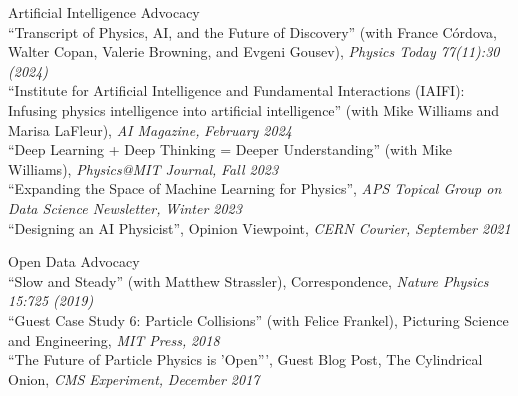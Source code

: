 \item Artificial Intelligence Advocacy\\ ``Transcript of Physics, AI, and the Future of Discovery'' (with France Córdova, Walter Copan, Valerie Browning, and Evgeni Gousev), \emph{Physics Today 77(11):30 (2024)}
\\ ``Institute for Artificial Intelligence and Fundamental Interactions (IAIFI): Infusing physics intelligence into artificial intelligence'' (with Mike Williams and Marisa LaFleur), \emph{AI Magazine,} \emph{February 2024}
\\ ``Deep Learning + Deep Thinking = Deeper Understanding'' (with Mike Williams), \emph{Physics@MIT Journal,} \emph{Fall 2023}
\\ ``Expanding the Space of Machine Learning for Physics'', \emph{APS Topical Group on Data Science Newsletter,} \emph{Winter 2023}
\\ ``Designing an AI Physicist'', Opinion Viewpoint, \emph{CERN Courier,} \emph{September 2021}
\item Open Data Advocacy\\ ``Slow and Steady'' (with Matthew Strassler), Correspondence, \emph{Nature Physics 15:725 (2019)}
\\ ``Guest Case Study 6:  Particle Collisions'' (with Felice Frankel), Picturing Science and Engineering, \emph{MIT Press,} \emph{2018}
\\ ``The Future of Particle Physics is 'Open''', Guest Blog Post, The Cylindrical Onion, \emph{CMS Experiment,} \emph{December 2017}
